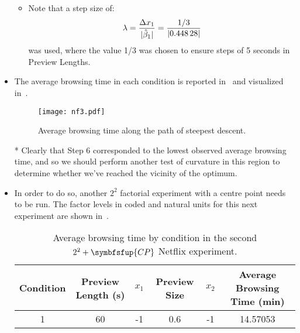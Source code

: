 \begin{itemize}
\begin{table}[!htbp]
\begin{tabular}
                  \bottomrule
              \end{tabular}
          \end{table}
          \begin{itemize}
              \item Note that a step size of:
                    \[ \lambda=\frac{\Delta x_1}{\lvert\hat{\beta}_1\rvert}=\frac{1/3}{\lvert\num{0.44828}\rvert}  \]
                    was used, where the value 1/3 was chosen to ensure steps of 5 seconds in Preview Lengths.
          \end{itemize}
    \item The average browsing time in each condition is reported in~ and visualized in~.
          \begin{figure}[!htbp]
              \centering
              \texttt{[image: nf3.pdf]}
              \caption{Average browsing time along the path of steepest descent.}\label{fig:nf3}
          \end{figure}
    \item[*] Clearly that Step 6 corresponded to the lowest observed average browsing time, and so we should
        perform another test of curvature in this region to determine whether we've reached the vicinity of the
        optimum.
    \item In order to do so, another $2^2$ factorial experiment with a centre point needs to be run. The factor
          levels in coded and natural units for this next experiment are shown in~.
          \begin{table}[!htbp]
              \centering
              \caption{Average browsing time by condition in the second $2^2 + \symbfsfup{CP}$ Netflix experiment.}\label{tab:netflixtab3}
              \begin{tabular}{
                      S[table-format=1.0]
                      S[table-format=2.0]
                      S[table-format=-1.0]
                      S[table-format=1.1]
                      S[table-format=-1]
                      S[table-format=2.3]
                  }
                  \toprule
                  {Condition} & {Preview Length (\unit{\second})} & {$x_{1}$} & {Preview Size} & {$x_{2}$} & {Average Browsing Time (\unit{\minute})} \\
                             & 60                                & -1        & 0.6            & -1        & 14.57053                                 \\

\end{tabular}
\end{table}
\end{itemize}
